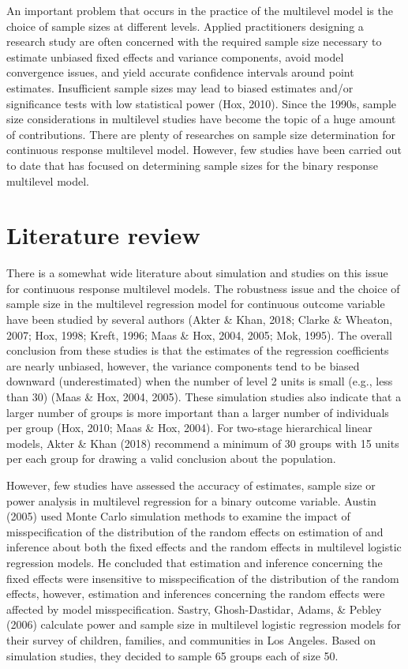 \documentclass[12pt,oneside,a4paper]{reedthesis}
\begin{document}
An important problem that occurs in the practice of the multilevel model is the choice of sample sizes at different levels. Applied practitioners designing a research study are often concerned with the required sample size necessary to estimate unbiased fixed effects and variance components, avoid model convergence issues, and yield accurate confidence intervals around point estimates.
Insufficient sample sizes may lead to biased estimates and/or significance tests with low statistical power (Hox, 2010). Since the 1990s, sample size considerations in multilevel studies have become the topic of a huge amount of contributions.
There are plenty of researches on sample size determination for continuous response multilevel model. However, few studies have been carried out to date that has focused on determining sample sizes for the binary response multilevel model.

\hypertarget{literature}{%
\section{Literature review}\label{literature}}

There is a somewhat wide literature about simulation and studies on this issue for continuous response multilevel models. The robustness issue and the choice of sample size in the multilevel regression model for continuous outcome variable have been studied by several authors (Akter \& Khan, 2018; Clarke \& Wheaton, 2007; Hox, 1998; Kreft, 1996; Maas \& Hox, 2004, 2005; Mok, 1995).
The overall conclusion from these studies is that the estimates of the regression coefficients are nearly unbiased, however, the variance components tend to be biased downward (underestimated) when the number of level 2 units is small (e.g., less than 30) (Maas \& Hox, 2004, 2005). These simulation studies also indicate that a larger number of groups is more important than a larger number of individuals per group (Hox, 2010; Maas \& Hox, 2004).
For two-stage hierarchical linear models, Akter \& Khan (2018) recommend a minimum of 30 groups with 15 units per each group for drawing a valid conclusion about the population.

However, few studies have assessed the accuracy of estimates, sample size or power analysis in multilevel regression for a binary outcome variable. Austin (2005) used Monte Carlo simulation methods to examine the impact of misspecification of the distribution of the random effects on estimation of and inference about both the fixed effects and the random effects in multilevel logistic regression models. He concluded that estimation and inference concerning the fixed effects were insensitive to misspecification of the distribution of the random effects, however, estimation and inferences concerning the random effects were affected by model misspecification. Sastry, Ghosh-Dastidar, Adams, \& Pebley (2006) calculate power and sample size in multilevel logistic regression models for their survey of children, families, and communities in Los Angeles. Based on simulation studies, they decided to sample 65 groups each of size 50.
\end{document}
